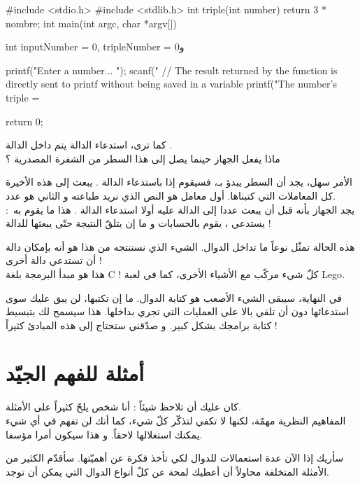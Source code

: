 \begin{Csource}
#include <stdio.h>
#include <stdlib.h>
int triple(int number)
{
	return 3 * nombre;
}
int main(int argc, char *argv[])
{
	int inputNumber = 0, tripleNumber = 0و
	
	printf("Enter a number... ");
	scanf("%
	// The result returned by the function is directly sent to printf without being saved in a variable
	printf("The number's triple = %
	
	return 0;
}
\end{Csource}

كما ترى، استدعاء الدالة 
يتم داخل الدالة 
.\\
ماذا يفعل الجهاز حينما يصل إلى هذا السطر من الشفرة المصدرية ؟

الأمر سهل، يجد أن السطر يبدؤ بـ،
فسيقوم إذا باستدعاء الدالة 
.
يبعث إلى هذه الأخيرة كل المعاملات التي كتبناها. أول معامل هو النص الذي نريد طباعته و الثاني هو عدد.\\
يجد الجهاز بأنه قبل أن يبعث عددا إلى الدالة 
عليه أولا استدعاء الدالة 
.
هذا ما يقوم به~: يستدعي 
،
يقوم بالحسابات و ما إن يتلقّ النتيجة حتّى يبعثها للدالة 
 !

هذه الحالة تمثّل نوعاً ما تداخل الدوال. الشيء الذي نستنتجه من هذا هو أنه بإمكان دالة أن تستدعي دالة أخرى !\\
هذا هو مبدأ البرمجة بلغة
\textenglish{C} !
كلّ شيء مركّب مع الأشياء الأخرى، كما في لعبة
\textenglish{Lego}.

في النهاية، سيبقى الشيء الأصعب هو كتابة الدوال. ما إن تكتبها، لن يبق عليك سوى استدعائها دون أن تلقي بالا على العمليات التي تجري بداخلها. هذا سيسمح لك بتبسيط كتابة برامجك بشكل كبير. و صدّقني ستحتاج إلى هذه المبادئ كثيراً !

\section{أمثلة للفهم الجيّد}

كان عليك أن تلاحظ شيئاً : أنا شخص يلحّ كثيراً على الأمثلة.\\
المفاهيم النظرية مهمّة، لكنها لا تكفي لتذكّر كلّ شيء، كما أنك لن تفهم في أي شيء يمكنك استغلالها لاحقاً. و هذا سيكون أمرا مؤسفا.

سأريك إذا الآن عدة استعمالات للدوال لكي تأخذ فكرة عن أهميّتها. سأقدّم الكثير من الأمثلة المتخلفة محاولاً أن أعطيك لمحة عن كلّ أنواع الدوال التي يمكن أن توجد.

